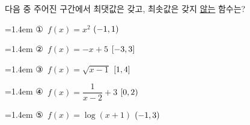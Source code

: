 다음 중 주어진 구간에서 최댓값은 갖고, 최솟값은 갖지 \underline{않는} 함수는?
\par\medskip\par\noindent\hangindent=1.4em {\small ①}\ $f(x)=x^2$ \quad $(-1{,}\mkern3mu\mathopen{}1)$\par\noindent\hangindent=1.4em {\small ②}\ $f(x)=-x+5$ \quad $[-3{,}\mkern3mu\mathopen{}3]$\par\noindent\hangindent=1.4em {\small ③}\ $f(x)=\sqrt{x-1}$ \quad $[1{,}\mkern3mu\mathopen{}4]$\par\noindent\hangindent=1.4em {\small ④}\ $f(x)=\dfrac{1}{x-2}+3$ \quad $[0{,}\mkern3mu\mathopen{}2)$\par\noindent\hangindent=1.4em {\small ⑤}\ $f(x)=\log(x+1)$ \quad $(-1{,}\mkern3mu\mathopen{}3)$\par\medskip
